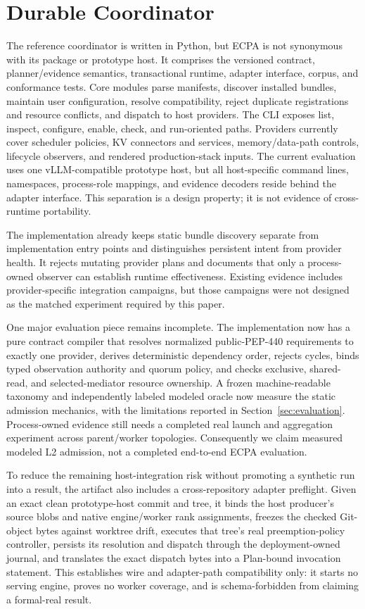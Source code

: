 \documentclass[letterpaper,twocolumn,10pt]{article}
\newcommand{\system}{\textsc{ECPA}\xspace}
\begin{document}
\section{Durable Coordinator}
The reference coordinator is written in Python, but \system is not synonymous
with its package or prototype host.  It comprises the versioned contract,
planner/evidence semantics, transactional runtime, adapter interface, corpus,
and conformance tests.  Core modules
parse manifests, discover installed bundles, maintain user configuration,
resolve compatibility, reject duplicate registrations and resource conflicts,
and dispatch to host providers.  The CLI exposes list, inspect, configure,
enable, check, and run-oriented paths.  Providers currently cover scheduler
policies, KV connectors and services, memory/data-path controls, lifecycle
observers, and rendered production-stack inputs.  The current evaluation uses
one vLLM-compatible prototype host, but all host-specific command lines,
namespaces, process-role mappings, and evidence decoders reside behind the
adapter interface.  This separation is a design property; it is not evidence
of cross-runtime portability.

The implementation already keeps static bundle discovery separate from
implementation entry points and distinguishes persistent intent from provider
health.  It rejects mutating provider plans and documents that only a
process-owned observer can establish runtime effectiveness.  Existing evidence
includes provider-specific integration campaigns, but those campaigns were not
designed as the matched experiment required by this paper.

One major evaluation piece remains incomplete.  The implementation now has a
pure contract compiler that resolves normalized public-PEP-440 requirements to
exactly one provider, derives deterministic dependency order, rejects cycles,
binds typed observation authority and quorum policy, and checks exclusive,
shared-read, and selected-mediator resource ownership.  A frozen
machine-readable taxonomy and independently labeled modeled oracle now measure
the static admission mechanics, with the limitations reported in
Section~\ref{sec:evaluation}.  Process-owned evidence still needs a completed
real launch and aggregation experiment across parent/worker topologies.
Consequently we claim measured modeled L2 admission, not a completed end-to-end
\system evaluation.

To reduce the remaining host-integration risk without promoting a synthetic
run into a result, the artifact also includes a cross-repository adapter
preflight.  Given an exact clean prototype-host commit and tree, it binds the host
producer's source blobs and native engine/worker rank assignments, freezes
the checked Git-object bytes against worktree drift, executes that tree's real
preemption-policy controller, persists its resolution and
dispatch through the deployment-owned journal, and translates the exact
dispatch bytes into a Plan-bound invocation statement.  This establishes wire
and adapter-path compatibility only: it starts no serving engine, proves no
worker coverage, and is schema-forbidden from claiming a formal-real result.
\end{document}
